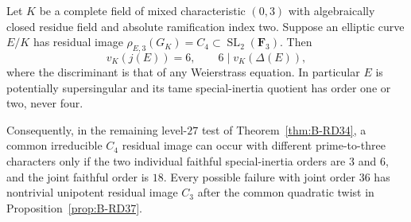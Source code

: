 \begin{proposition}
\label{prop:B-RD38}
Let $K$ be a complete field of mixed characteristic $(0,3)$ with
algebraically closed residue field and absolute ramification index two.
Suppose an elliptic curve $E/K$ has residual image
$\rho_{E,3}(G_K)=C_4\subset\operatorname{SL}_2(\mathbf F_3)$.
Then
\[
                  v_K(j(E))=6,
       \qquad     6\mid v_K(\Delta(E)),
                                                        \tag{B-RD38.1}
\]
where the discriminant is that of any Weierstrass equation.
In particular $E$ is potentially supersingular and its tame
special-inertia quotient has order one or two, never four.

Consequently, in the remaining level-$27$ test of
Theorem~\ref{thm:B-RD34}, a common irreducible $C_4$ residual image
can occur with different prime-to-three characters only if the two
individual faithful special-inertia orders are $3$ and $6$, and the
joint faithful order is $18$. Every possible failure with joint order
$36$ has nontrivial unipotent residual image $C_3$ after the common
quadratic twist in Proposition~\ref{prop:B-RD37}.
\end{proposition}
